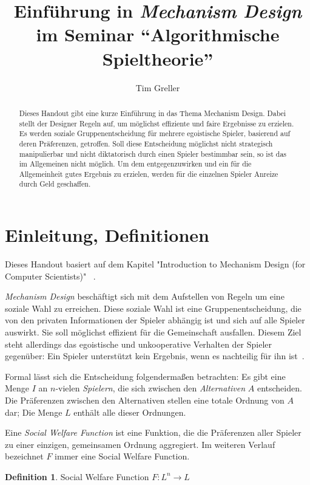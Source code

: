 \documentclass[a4paper,11pt]{article}
\title{Einführung in \textit{Mechanism Design} \\ \Large im Seminar ``Algorithmische Spieltheorie''}
\author{Tim Greller}
\theoremstyle{definition}
\newtheorem{definition}{Definition}
\theoremstyle{plain}
\theoremstyle{definition}
\begin{document}
\maketitle

\begin{abstract}
	Dieses Handout gibt eine kurze Einführung in das Thema Mechanism Design. Dabei stellt der Designer Regeln auf, um möglichst effiziente und faire Ergebnisse zu erzielen. Es werden soziale Gruppenentscheidung für mehrere egoistische Spieler, basierend auf deren Präferenzen, getroffen. Soll diese Entscheidung möglichst nicht strategisch manipulierbar und nicht diktatorisch durch einen Spieler bestimmbar sein, so ist das im Allgemeinen nicht möglich. Um dem entgegenzuwirken und ein für die Allgemeinheit gutes Ergebnis zu erzielen, werden für die einzelnen Spieler Anreize durch Geld geschaffen.
\end{abstract}

\setcounter{page}{0}
\fancyhead{}
\fancyhead[ER]{\leftmark}
\fancyhead[OL]{\rightmark}
\fancyhead[EL,OR]{\thepage}
\pagestyle{fancy}

\section{Einleitung, Definitionen}
Dieses Handout basiert auf dem Kapitel "Introduction to Mechanism Design (for Computer Scientists)" ~\cite{nis07}.

\emph{Mechanism Design} beschäftigt sich mit dem Aufstellen von Regeln um eine soziale Wahl zu erreichen. Diese soziale Wahl ist eine Gruppenentscheidung, die von den privaten Informationen der Spieler abhängig ist und sich auf alle Spieler auswirkt. Sie soll möglichst effizient für die Gemeinschaft ausfallen. Diesem Ziel steht allerdings das egoistische und unkooperative Verhalten der Spieler gegenüber: Ein Spieler unterstützt kein Ergebnis, wenn es nachteilig für ihn ist~\cite{ste08}.

Formal lässt sich die Entscheidung folgendermaßen betrachten:
Es gibt eine Menge $I$ an $n$-vielen \emph{Spielern}, die sich zwischen den \emph{Alternativen} $A$ entscheiden. Die Präferenzen zwischen den Alternativen stellen eine totale Ordnung von $A$ dar; Die Menge $L$ enthält alle dieser Ordnungen.

Eine \emph{Social Welfare Function} ist eine Funktion, die die Präferenzen aller Spieler zu einer einzigen, gemeinsamen Ordnung aggregiert. Im weiteren Verlauf bezeichnet $F$ immer eine Social Welfare Function.
\begin{definition}
	\label{def:socialwelfarefunc}
	Social Welfare Function $F : L^n \rightarrow L$
\end{definition}
\end{document}
